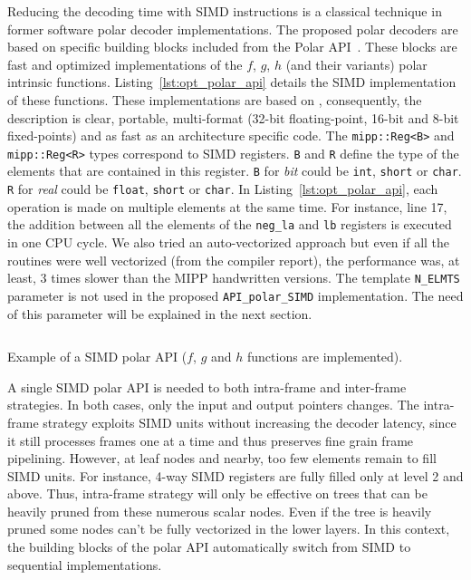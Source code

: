 Reducing the decoding time with SIMD instructions is a classical technique in
former software polar decoder implementations. The proposed polar decoders are
based on specific building blocks included from the Polar
API~\cite{Cassagne2015c,Cassagne2016b}. These blocks are fast and optimized
implementations of the $f$, $g$, $h$ (and their variants) polar intrinsic
functions. Listing~\ref{lst:opt_polar_api} details the SIMD implementation of
these functions. These implementations are based on \MIPP, consequently, the
description is clear, portable, multi-format (32-bit floating-point, 16-bit and
8-bit fixed-points) and as fast as an architecture specific code. The
\verb|mipp::Reg<B>| and \verb|mipp::Reg<R>| types correspond to SIMD registers.
\verb|B| and \verb|R| define the type of the elements that are contained in this
register. \verb|B| for \textit{bit} could be \verb|int|, \verb|short| or
\verb|char|. \verb|R| for \textit{real} could be \verb|float|, \verb|short| or
\verb|char|. In Listing~\ref{lst:opt_polar_api}, each operation is made on
multiple elements at the same  time. For instance, line 17, the addition between
all the elements of the \verb|neg_la| and \verb|lb| registers is executed in one
CPU cycle. We also tried an auto-vectorized approach but even if all the
routines were well vectorized (from the compiler report), the performance was,
at least, 3 times slower than the MIPP handwritten versions. The template
\verb|N_ELMTS| parameter is not used in the proposed \verb|API_polar_SIMD|
implementation. The need of this parameter will be explained in the next
section.

\begin{listing}%
  \inputminted[frame=lines,linenos]{C++}{\curChapter/src/polar/f_g_h_simd.cpp}
  \caption{Example of a \Cxx SIMD polar API ($f$, $g$ and $h$ functions are
    implemented).}
  \label{lst:opt_polar_api}
\end{listing}

A single SIMD polar API is needed to both intra-frame and inter-frame
strategies. In both cases, only the input and output pointers changes. The
intra-frame strategy exploits SIMD units without increasing the decoder latency,
since it still processes frames one at a time and thus preserves fine grain
frame pipelining. However, at leaf nodes and nearby, too few elements remain to
fill SIMD units. For instance, 4-way SIMD registers are fully filled only at
level 2 and above. Thus, intra-frame strategy will only be effective on trees
that can be heavily pruned from these numerous scalar nodes. Even if the tree is
heavily pruned some nodes can't be fully vectorized in the lower layers. In this
context, the building blocks of the polar API automatically switch from SIMD to
sequential implementations.

